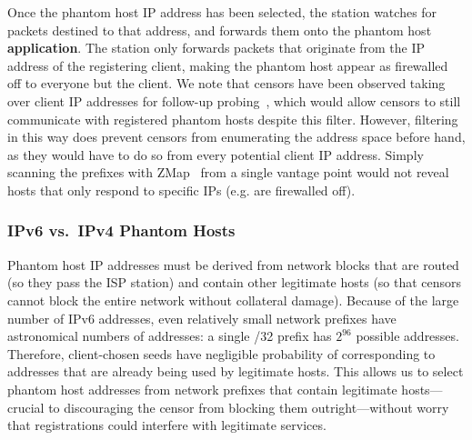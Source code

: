 \documentclass[sigconf]{acmart}
\begin{document}
Once the phantom host IP address has been selected, the station watches for
packets destined to that address, and forwards them onto the phantom host
\textbf{application}. The station only forwards packets that originate from the
IP address of the registering client, making the phantom host appear as
firewalled off to everyone but the client.
We note that censors have been observed taking over client IP
addresses for follow-up probing~\cite{ensafi-tor}, which would allow censors to
still communicate with registered phantom hosts despite this filter.
However, filtering in this way does prevent censors from enumerating the
address space before hand, as they would have to do so from every potential
client IP address. Simply scanning the prefixes with ZMap~\cite{zmap13} from a
single vantage point would not reveal hosts that only respond to specific IPs
(e.g. are firewalled off).

\subsubsection{IPv6 vs.\ IPv4 Phantom Hosts}

Phantom host IP addresses must be derived from network blocks that are routed (so they pass
the ISP station) and contain other legitimate hosts (so that censors cannot
block the entire network without collateral damage).
Because of the large number of IPv6 addresses, even
relatively small network prefixes have astronomical numbers of addresses: a
single /32 prefix has $2^{96}$ possible addresses. Therefore, client-chosen
seeds have negligible probability of corresponding to addresses that are already
being used by legitimate hosts. This allows us to select phantom host addresses
from network prefixes that contain
legitimate hosts---crucial to discouraging the censor from blocking them
outright---without worry that registrations could interfere with legitimate
services.

\end{document}
